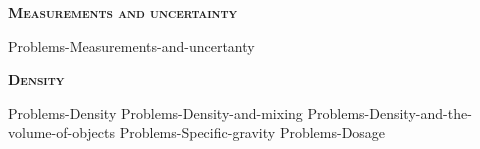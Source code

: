 \documentclass[main.tex]{subfiles}
\begin{document}
\begin{multicols*}{2}
 
{\raggedright\textsc{\textbf{Measurements and uncertainty }}\par}
{Problems-Measurements-and-uncertanty}


 \iftoggle{chem121}{}{  {\raggedright\textsc{\textbf{Matter}}\par}  {Problems-Mixtures} {Problems-States-of-matter}    }
{\raggedright\textsc{\textbf{Density}}\par}
{Problems-Density}
{Problems-Density-and-mixing}
{Problems-Density-and-the-volume-of-objects}
{Problems-Specific-gravity}
{Problems-Dosage}







 





\end{multicols*} \iftoggle{showfinalanswers}{
\newpage\fancyhfoffset[E,O]{0pt}
\begin{answerbox}
\begin{answersenvironment}
 \begin{localsize}{10}
{ \checkoddpage\ifoddpage    \else   \clearpage\thispagestyle{empty}\mbox{}\clearpage\fi
\Large \bf Answers}
\SetupExSheets{ headings = inline-nr , counter-format = qu) ,}

\providetoggle{printOddAnswers}\settoggle{printOddAnswers}{\printOddAnswers}\iftoggle{printOddAnswers}{\printsolutions[section] }{\printsolutions}
  \vspace{20cm}
 \end{localsize}
 \end{answersenvironment}
\end{answerbox}
}{}
\checkoddpage\ifoddpage   \clearpage\thispagestyle{empty}\mbox{}\clearpage \else   \fi
\end{document}
